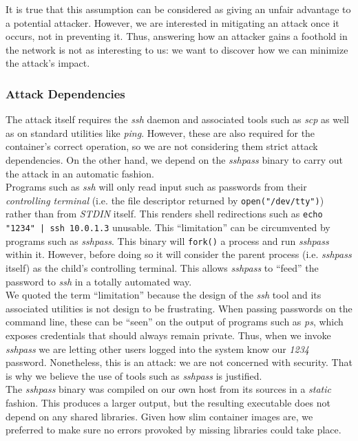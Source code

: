             It is true that this assumption can be considered as giving an unfair advantage to a potential attacker. However, we are interested in mitigating an attack once it occurs, not in preventing it. Thus, answering how an attacker gains a foothold in the network is not as interesting to us: we want to discover how we can minimize the attack's impact.\\

        \subsubsection{Attack Dependencies}
            The attack itself requires the \textit{ssh} daemon and associated tools such as \textit{scp} as well as on standard utilities like \textit{ping}. However, these are also required for the container's correct operation, so we are not considering them strict attack dependencies. On the other hand, we depend on the \textit{sshpass} binary to carry out the attack in an automatic fashion.\\

            Programs such as \textit{ssh} will only read input such as passwords from their \textit{controlling terminal} (i.e. the file descriptor returned by \texttt{open("/dev/tty")}) rather than from \textit{STDIN} itself. This renders shell redirections such as \texttt{echo "1234" | ssh 10.0.1.3} unusable. This ``limitation'' can be circumvented by programs such as \textit{sshpass}. This binary will \texttt{fork()} a process and run \textit{sshpass} within it. However, before doing so it will consider the parent process (i.e. \textit{sshpass} itself) as the child's controlling terminal. This allows \textit{sshpass} to ``feed'' the password to \textit{ssh} in a totally automated way.\\

            We quoted the term ``limitation'' because the design of the \textit{ssh} tool and its associated utilities is not design to be frustrating. When passing passwords on the command line, these can be ``seen'' on the output of programs such as \textit{ps}, which exposes credentials that should always remain private. Thus, when we invoke \textit{sshpass} we are letting other users logged into the system know our \textit{1234} password. Nonetheless, this is an attack: we are not concerned with security. That is why we believe the use of tools such as \textit{sshpass} is justified.\\

            The \textit{sshpass} binary was compiled on our own host from its sources \cite{bib:src-sshpass} in a \textit{static} fashion. This produces a larger output, but the resulting executable does not depend on any shared libraries. Given how slim container images are, we preferred to make sure no errors provoked by missing libraries could take place.\\

